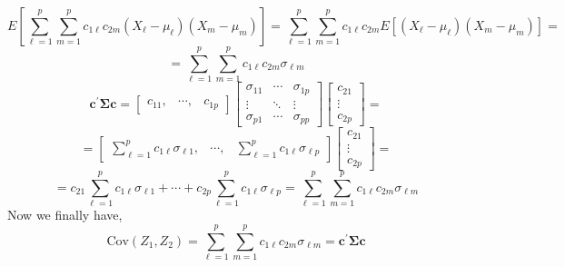         \[
            E\left[\sum_{\ell=1}^{p}{\sum_{m=1}^{p}{c_{1\ell}c_{2m}\left(X_{\ell} - \mu_{\ell}\right)\left(X_{m} - \mu_{m}\right)}}\right]
            =
            \sum_{\ell=1}^{p}{\sum_{m=1}^{p}{c_{1\ell}c_{2m}E\left[\left(X_{\ell} - \mu_{\ell}\right)\left(X_{m} - \mu_{m}\right)\right]}}
            =
        \]
        \[
            =
            \sum_{\ell=1}^{p}{\sum_{m=1}^{p}{c_{1\ell}c_{2m}\sigma_{\ell m}}}
        \]
        \[
            \mathbf{c}^\prime\mathbf{\Sigma}\mathbf{c}
            =
            \begin{bmatrix}
                c_{11}, & \cdots, & c_{1p}
            \end{bmatrix}
            \begin{bmatrix}
                \sigma_{11} & \cdots & \sigma_{1p} \\
                \vdots & \ddots & \vdots \\
                \sigma_{p1} & \cdots & \sigma_{pp}
            \end{bmatrix}
            \begin{bmatrix}
                c_{21} \\
                \vdots \\
                c_{2p}
            \end{bmatrix}
            =
        \]
        \[
            =
            \begin{bmatrix}
                \sum_{\ell=1}^{p}{c_{1\ell}\sigma_{\ell 1}}, & \cdots, & \sum_{\ell=1}^{p}{c_{1\ell}\sigma_{\ell p}}
            \end{bmatrix}
            \begin{bmatrix}
                c_{21} \\
                \vdots \\
                c_{2p}
            \end{bmatrix}
            =
        \]
        \[
            =
            c_{21}\sum_{\ell=1}^{p}{c_{1\ell}\sigma_{\ell 1}} + \cdots + c_{2p}\sum_{\ell=1}^{p}{c_{1\ell}\sigma_{\ell p}}
            =
            \sum_{\ell=1}^{p}{\sum_{m=1}^{p}{c_{1\ell}c_{2m}\sigma_{\ell m}}}
        \]
        Now we finally have,
        \[
            \text{Cov}\left(Z_1, Z_2\right)
            =
            \sum_{\ell=1}^{p}{\sum_{m=1}^{p}{c_{1\ell}c_{2m}\sigma_{\ell m}}}
            =
            \mathbf{c}^\prime\mathbf{\Sigma}\mathbf{c}
        \]